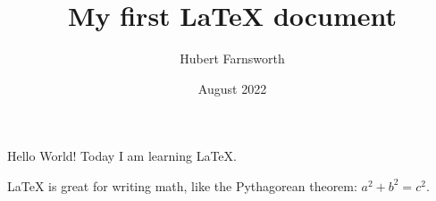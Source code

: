 \documentclass{article}
\title{My first LaTeX document}
\author{Hubert Farnsworth}
\date{August 2022}
\begin{document}
  \maketitle

  Hello World! Today I am learning \LaTeX. 

  \LaTeX{} is great for writing math, like the Pythagorean theorem: $a^2+b^2=c^2$.
\end{document}
